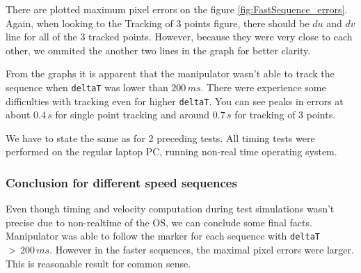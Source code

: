 \documentclass[]{scrartcl}
\begin{document}
There are plotted maximum pixel errors on the figure \ref{fig:FastSequence_errors}. Again, when looking to the Tracking of 3 points figure, there should be $du$ and $dv$ line for all of the 3 tracked points. However, because they were very close to each other, we ommited the another two lines in the graph for better clarity. 

From the graphs it is apparent that the manipulator wasn't able to track the sequence when \texttt{deltaT} was lower than $200\,ms$. There were experience some difficulties with tracking even for higher \texttt{deltaT}. You can see peaks in errors at about $0.4\, s$ for single point tracking and around $0.7\,s$ for tracking of 3 points.

We have to state the same as for 2 preceding tests. All timing tests were performed on the regular laptop PC, running non-real time operating system. 

\subsubsection*{Conclusion for different speed sequences}
Even though timing and velocity computation during test simulations wasn't precise due to non-realtime of the OS, we can conclude some final facts. 
Manipulator was able to follow the marker for each sequence with \texttt{deltaT} $ >\, 200\,ms$. However in the faster sequences, the maximal pixel errors were larger. This is reasonable result for common sense.
\end{document}
